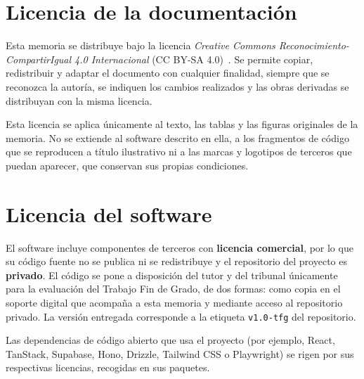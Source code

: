 \section*{Licencia de la documentación}

Esta memoria se distribuye bajo la licencia \textit{Creative Commons
Reconocimiento-CompartirIgual 4.0 Internacional} (CC BY-SA
4.0)~\cite{cc-by-sa-4}. Se permite copiar, redistribuir y adaptar el
documento con cualquier finalidad, siempre que se reconozca la autoría, se
indiquen los cambios realizados y las obras derivadas se distribuyan con la
misma licencia.

Esta licencia se aplica únicamente al texto, las tablas y las figuras
originales de la memoria. No se extiende al software descrito en ella, a los
fragmentos de código que se reproducen a título ilustrativo ni a las marcas y
logotipos de terceros que puedan aparecer, que conservan sus propias
condiciones.

\section*{Licencia del software}

El software incluye componentes de terceros con \textbf{licencia
comercial}, por lo que su código fuente no se publica ni se redistribuye y el
repositorio del proyecto es \textbf{privado}. El código se pone a disposición
del tutor y del tribunal únicamente para la evaluación del Trabajo Fin de
Grado, de dos formas: como copia en el soporte digital que acompaña a esta
memoria y mediante acceso al repositorio privado. La versión entregada
corresponde a la etiqueta \texttt{v1.0-tfg} del repositorio.

Las dependencias de código abierto que usa el proyecto (por ejemplo, React,
TanStack, Supabase, Hono, Drizzle, Tailwind CSS o Playwright) se rigen por sus
respectivas licencias, recogidas en sus paquetes.
